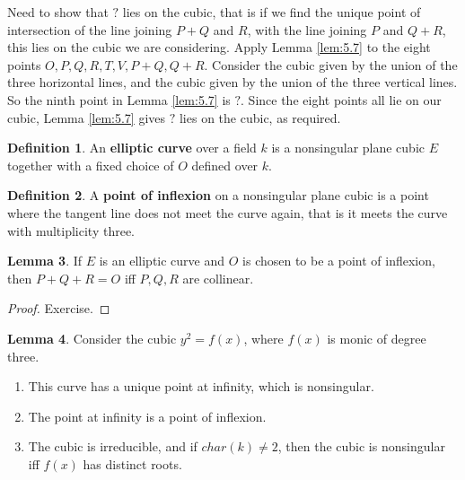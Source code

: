 \documentclass{article}
\newcommand{\rb}[1]{\left( #1 \right)}
\theoremstyle{definition}\newtheorem{definition}{Definition}[section]
\theoremstyle{definition}\newtheorem{remark}[definition]{Remark}
\theoremstyle{definition}\newtheorem*{example}{Example}
\theoremstyle{definition}\newtheorem*{note}{Note}
\newtheorem{lemma}[definition]{Lemma}
\begin{document}
Need to show that $ ? $ lies on the cubic, that is if we find the unique point of intersection of the line joining $ P + Q $ and $ R $, with the line joining $ P $ and $ Q + R $, this lies on the cubic we are considering. Apply Lemma \ref{lem:5.7} to the eight points $ O, P, Q, R, T, V, P + Q, Q + R $. Consider the cubic given by the union of the three horizontal lines, and the cubic given by the union of the three vertical lines. So the ninth point in Lemma \ref{lem:5.7} is $ ? $. Since the eight points all lie on our cubic, Lemma \ref{lem:5.7} gives $ ? $ lies on the cubic, as required.

\begin{definition}
An \textbf{elliptic curve} over a field $ k $ is a nonsingular plane cubic $ E $ together with a fixed choice of $ O $ defined over $ k $.
\end{definition}

\begin{definition}
A \textbf{point of inflexion} on a nonsingular plane cubic is a point where the tangent line does not meet the curve again, that is it meets the curve with multiplicity three.
\end{definition}

\begin{lemma}
\label{lem:5.10}
If $ E $ is an elliptic curve and $ O $ is chosen to be a point of inflexion, then $ P + Q + R = O $ iff $ P, Q, R $ are collinear.
\end{lemma}

\begin{proof}
Exercise.
\end{proof}

\begin{lemma}
Consider the cubic $ y^2 = f\rb{x} $, where $ f\rb{x} $ is monic of degree three.
\begin{enumerate}
\item This curve has a unique point at infinity, which is nonsingular.
\item The point at infinity is a point of inflexion.
\item The cubic is irreducible, and if $ char\rb{k} \ne 2 $, then the cubic is nonsingular iff $ f\rb{x} $ has distinct roots.
\end{enumerate}
\end{lemma}
\end{document}
